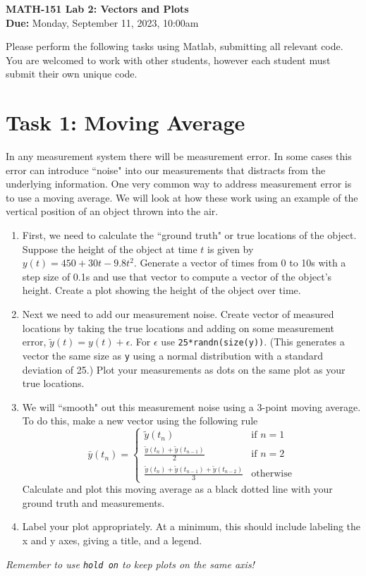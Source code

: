 \documentclass[11pt]{article}
\begin{document}
	
	\begin{center}
		\Large{\textbf{MATH-151 Lab 2: Vectors and Plots}}\\
			\medskip
		\normalsize{\textbf{Due:} Monday, September 11, 2023, 10:00am} 
	\end{center}
	\noindent\makebox[\linewidth]{\rule{\textwidth}{0.4pt}}
	Please perform the following tasks using Matlab, submitting all relevant code. You are welcomed to work with other students, however each student must submit their own unique code.
	\section*{Task 1: Moving Average}
	\noindent In any measurement system there will be measurement error. In some cases this error can introduce ``noise" into our measurements that distracts from the underlying information. One very common way to address measurement error is to use a moving average. We will look at how these work using an example of the vertical position of an object thrown into the air.\\
	\begin{enumerate}[label=\alph*)]
		\item First, we need to calculate the ``ground truth" or true locations of the object. Suppose the height of the object at time $t$ is given by $y(t) = 450 + 30t - 9.8t^2$. Generate a vector of times from 0 to 10s with a step size of 0.1s and use that vector to compute a vector of the object's height. Create a plot showing the height of the object over time.
		\item Next we need to add our measurement noise. Create vector of measured locations by taking the true locations and adding on some measurement error, $\tilde{y}(t) = y(t) + \epsilon$. For $\epsilon$ use \texttt{25*randn(size(y))}. (This generates a vector the same size as \texttt{y} using a normal distribution with a standard deviation of 25.) Plot your measurements as dots on the same plot as your true locations.
		\item We will ``smooth" out this measurement noise using a 3-point moving average. To do this, make a new vector using the following rule
		\begin{equation*}
			\bar{y}(t_n) =  \begin{cases}
				\tilde{y}(t_n) & \text{if } n=1 \\
				\frac{\tilde{y}(t_n) + \tilde{y}(t_{n-1})}{2} & \text{if } n=2 \\
				\frac{\tilde{y}(t_n) + \tilde{y}(t_{n-1}) +\tilde{y}(t_{n-2})}{3} & \text{otherwise}
			\end{cases}
		\end{equation*}
		Calculate and plot this moving average as a black dotted line with your ground truth and measurements.
		\item Label your plot appropriately. At a minimum, this should include labeling the x and y axes, giving a title, and a legend.
	\end{enumerate}

	\begin{center}
		\vfill
		\textit{Remember to use \texttt{hold on} to keep plots on the same axis!}
	\end{center}
\end{document}
